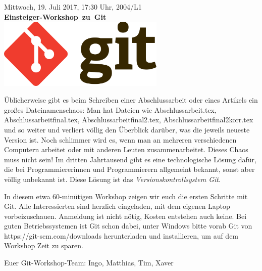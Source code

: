 \documentclass[a4paper,ngerman,landscape]{scrartcl}
\begin{document}
\begin{center}
  \Huge
  \vspace*{0.0em}
  Mittwoch, 19. Juli 2017, 17:30 Uhr, 2004/L1 \\
  \mbox{\textbf{Einsteiger-Workshop zu Git}}
  \vfill
  \vspace{0.3em}
  \includegraphics[width=0.6\textwidth]{git-logo}
  \vfill

  \Large
  \begin{minipage}{0.92\textwidth}
    \setlength\parskip{\medskipamount}
    \vspace{0.3em}
    Üblicherweise gibt es beim Schreiben einer Abschlussarbeit oder eines
    Artikels ein großes Dateinamenschaos: Man hat Dateien wie
    Abschlussarbeit.tex, Abschlussarbeitfinal.tex, Abschlussarbeitfinal2.tex,
    Abschlussarbeitfinal2korr.tex und so weiter und verliert völlig den
    Überblick darüber, was die jeweils neueste Version ist. Noch schlimmer wird
    es, wenn man an mehreren verschiedenen Computern arbeitet oder mit anderen
    Leuten zusammenarbeitet. Dieses Chaos muss nicht sein! Im dritten
    Jahrtausend gibt es eine technologische Lösung dafür, die bei
    Programmiererinnen und Programmierern allgemeint bekannt, sonst aber völlig
    unbekannt ist. Diese Lösung ist das \emph{Versionskontrollsystem Git}.

    In diesem etwa 60-minütigen Workshop zeigen wir euch
    die ersten Schritte mit Git. Alle Interessierten sind herzlich
    eingeladen, mit dem eigenen Laptop vorbeizuschauen. Anmeldung ist nicht
    nötig, Kosten entstehen auch keine. Bei guten Betriebssystemen ist Git
    schon dabei, unter Windows bitte vorab Git von
    \textsf{https:/$\!$/git-scm.com/downloads} herunterladen und installieren,
    um auf dem Workshop Zeit zu sparen.

    Euer Git-Workshop-Team:
    Ingo, Matthias, Tim, Xaver
  \end{minipage}
\end{center}
\end{document}
